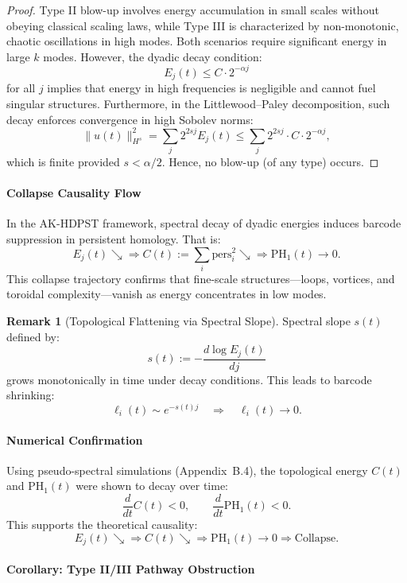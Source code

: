 \documentclass[11pt]{article}
\theoremstyle{definition}
\newtheorem{remark}[theorem]{Remark}
\begin{document}
\begin{proof}
Type II blow-up involves energy accumulation in small scales without obeying classical scaling laws, while Type III is characterized by non-monotonic, chaotic oscillations in high modes. Both scenarios require significant energy in large $k$ modes. However, the dyadic decay condition:
\[
E_j(t) \le C \cdot 2^{-\alpha j}
\]
for all $j$ implies that energy in high frequencies is negligible and cannot fuel singular structures. Furthermore, in the Littlewood–Paley decomposition, such decay enforces convergence in high Sobolev norms:
\[
\| u(t) \|_{H^s}^2 = \sum_j 2^{2sj} E_j(t) \le \sum_j 2^{2sj} \cdot C \cdot 2^{-\alpha j},
\]
which is finite provided $s < \alpha/2$. Hence, no blow-up (of any type) occurs.
\end{proof}

\paragraph{Collapse Causality Flow}

In the AK-HDPST framework, spectral decay of dyadic energies induces barcode suppression in persistent homology. That is:
\[
E_j(t) \searrow \Rightarrow C(t) := \sum_i \text{pers}_i^2 \searrow \Rightarrow \mathrm{PH}_1(t) \to 0.
\]
This collapse trajectory confirms that fine-scale structures—loops, vortices, and toroidal complexity—vanish as energy concentrates in low modes.

\begin{remark}[Topological Flattening via Spectral Slope]
Spectral slope $s(t)$ defined by:
\[
s(t) := - \frac{d \log E_j(t)}{dj}
\]
grows monotonically in time under decay conditions. This leads to barcode shrinking:
\[
\ell_i(t) \sim e^{-s(t)j} \quad \Rightarrow \quad \ell_i(t) \to 0.
\]
\end{remark}

\paragraph{Numerical Confirmation}

Using pseudo-spectral simulations (Appendix~B.4), the topological energy $C(t)$ and $\mathrm{PH}_1(t)$ were shown to decay over time:
\[
\frac{d}{dt} C(t) < 0, \qquad \frac{d}{dt} \mathrm{PH}_1(t) < 0.
\]
This supports the theoretical causality:
\[
E_j(t) \searrow \Rightarrow C(t) \searrow \Rightarrow \mathrm{PH}_1(t) \to 0 \Rightarrow \text{Collapse}.
\]

\paragraph{Corollary: Type II/III Pathway Obstruction}
\end{document}
